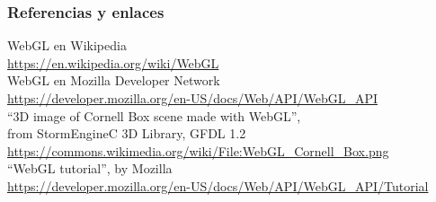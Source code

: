 \begin{frame}
\frametitle{Referencias y enlaces}

\begin{flushright}
  WebGL en Wikipedia \\
  \url{https://en.wikipedia.org/wiki/WebGL} \\
  \vspace{.5cm}
  WebGL en Mozilla Developer Network \\
  \url{https://developer.mozilla.org/en-US/docs/Web/API/WebGL_API} \\
  \vspace{.5cm}
  ``3D image of Cornell Box scene made with WebGL'', \\
  from StormEngineC 3D Library, GFDL 1.2 \\
  \url{https://commons.wikimedia.org/wiki/File:WebGL_Cornell_Box.png} \\
  \vspace{.5cm}
  ``WebGL tutorial'', by Mozilla \\
  \url{https://developer.mozilla.org/en-US/docs/Web/API/WebGL_API/Tutorial} \\
\end{flushright}  

\end{frame}







